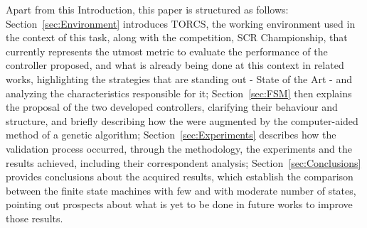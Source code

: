 	Apart from this Introduction,  this  paper is structured as follows: Section~\ref{sec:Environment} introduces
	TORCS, the working environment used in the context of this task, along with the competition, SCR Championship,
	that currently represents the utmost metric to evaluate the performance of the controller proposed, and what is
	already being done at this context in related works, highlighting the strategies that are standing out - State of
	the Art - and analyzing the characteristics responsible for it; Section~\ref{sec:FSM} then explains the proposal
	of the two developed controllers, clarifying their behaviour and structure, and briefly describing how the were
	augmented by the computer-aided method of a genetic algorithm; Section~\ref{sec:Experiments} describes how the
	validation process occurred, through the methodology, the experiments and the results achieved, including their
	correspondent analysis; Section~\ref{sec:Conclusions} provides conclusions about the acquired results, which
	establish the comparison between the finite state machines with few and with moderate number of states, pointing
	out prospects about what is yet to be done in future works to improve those results. 
